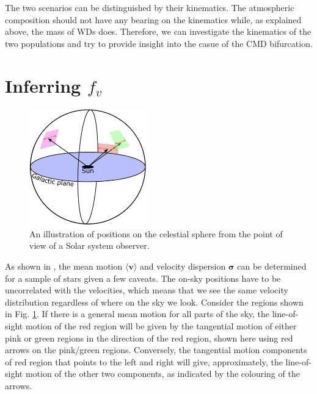 The two scenarios can be distinguished by their kinematics. The atmospheric composition should not have any bearing on the kinematics while, as explained above, the mass of WDs does. Therefore, we can investigate the kinematics of the two populations and try to provide insight into the casue of the CMD bifurcation. 

\section{Inferring $f_v$}\label{sec:p2-inferring}
\begin{figure}[t]
    \centering
    \includegraphics[width=0.45\textwidth]{images/projection.png}
    \caption{An illustration of positions on the celestial sphere from the point of view of a Solar system observer.} %
    \label{fig:projection}
\end{figure}
As shown in \cite{dehnen:98b}, the mean motion $\langle\bm{v}\rangle$ and velocity dispersion $\bm{\sigma}$ can be determined for a sample of stars given a few caveats. The on-sky positions have to be uncorrelated with the velocities, which means that we see the same velocity distribution regardless of where on the sky we look. Consider the regions shown in Fig. \ref{fig:projection}. If there is a general mean motion for all parts of the sky, the line-of-sight motion of the red region will be given by the tangential motion of either pink or green regions in the direction of the red region, shown here using red arrows on the pink/green regions. Conversely, the tangential motion components of red region that points to the left and right will give, approximately, the line-of-sight motion of the other two components, as indicated by the colouring of the arrows. 

